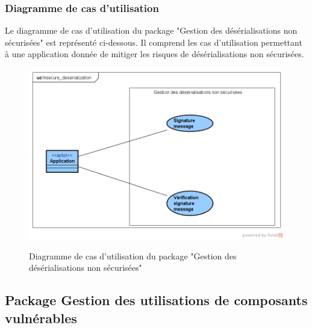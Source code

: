 \subsubsection{Diagramme de cas d'utilisation}
Le diagramme de cas d'utilisation du package "Gestion des désérialisations non sécurisées" est représenté ci-dessous. Il comprend les cas d'utilisation permettant à une application donnée de mitiger les risques de désérialisations non sécurisées.\\ 
\begin{figure}[H]
	\centering
	\begin{minipage}{12cm}
		\centering
		{\includegraphics[height=0.25\textheight]{fig/Insecure_deserialization-use-case-diagram.png}}
	\end{minipage}
	\caption{Diagramme de cas d'utilisation du package "Gestion des désérialisations non sécurisées"}
	\label{fig:7.9}
\end{figure}

\subsection{Package Gestion des utilisations de composants vulnérables}
